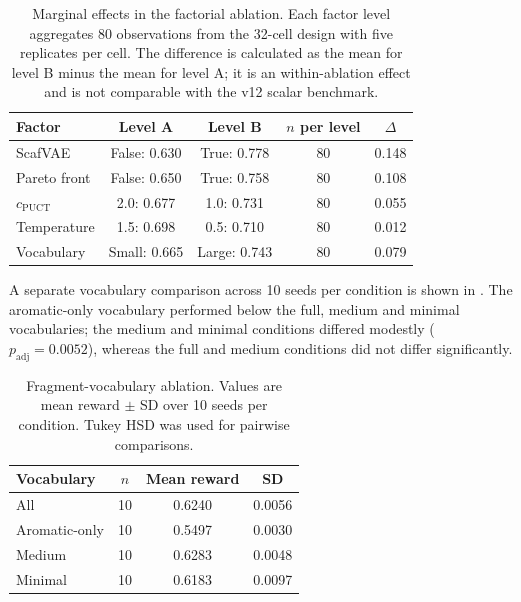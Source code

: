 \documentclass[10pt,a4paper]{article}
\begin{document}
\begin{table}[htbp]
  \centering
  \caption{Marginal effects in the factorial ablation. Each factor level
  aggregates \num{80} observations from the \num{32}-cell design with five
  replicates per cell. The difference is calculated as the mean for level B
  minus the mean for level A; it is an within-ablation effect and is not
  comparable with the v12 scalar benchmark.}
  \label{tab:sm_component_ablation}
  \small
  \begin{tabular}{lcccS[table-format=1.3]}
    \toprule
    Factor & Level A & Level B & $n$ per level & $\Delta$ \\
    \midrule
    ScafVAE & False: \num{0.630} & True: \num{0.778} & \num{80} & \num{0.148} \\
    Pareto front & False: \num{0.650} & True: \num{0.758} & \num{80} & \num{0.108} \\
    $c_{\mathrm{PUCT}}$ & \num{2.0}: \num{0.677} & \num{1.0}: \num{0.731} & \num{80} & \num{0.055} \\
    Temperature & \num{1.5}: \num{0.698} & \num{0.5}: \num{0.710} & \num{80} & \num{0.012} \\
    Vocabulary & Small: \num{0.665} & Large: \num{0.743} & \num{80} & \num{0.079} \\
    \bottomrule
  \end{tabular}
\end{table}

A separate vocabulary comparison across \num{10} seeds per condition is shown in . The aromatic-only vocabulary performed below the full, medium and minimal vocabularies; the medium and minimal conditions differed modestly ($p_{\mathrm{adj}}=\num{0.0052}$), whereas the full and medium conditions did not differ significantly.

\begin{table}[htbp]
  \centering
  \caption{Fragment-vocabulary ablation. Values are mean reward $\pm$ SD over
  \num{10} seeds per condition. Tukey HSD was used for pairwise comparisons.}
  \label{tab:sm_vocabulary_ablation}
  \small
  \begin{tabular}{lccc}
    \toprule
    Vocabulary & $n$ & Mean reward & SD \\
    \midrule
    All & \num{10} & \num{0.6240} & \num{0.0056} \\
    Aromatic-only & \num{10} & \num{0.5497} & \num{0.0030} \\
    Medium & \num{10} & \num{0.6283} & \num{0.0048} \\
    Minimal & \num{10} & \num{0.6183} & \num{0.0097} \\
    \bottomrule
  \end{tabular}
\end{table}
\end{document}

